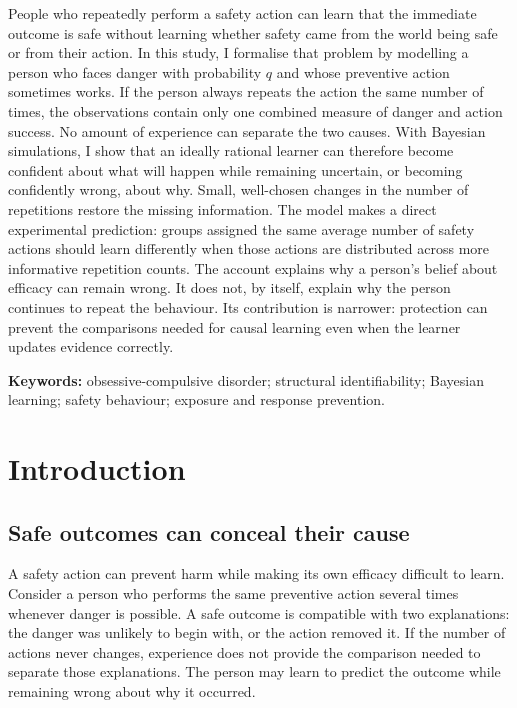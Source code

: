 \documentclass[11pt]{article}
\begin{document}
People who repeatedly perform a safety action can learn that the immediate outcome is safe
without learning whether safety came from the world being safe or from their action. In this study, I
formalise that problem by modelling a person who faces danger with probability $q$ and whose preventive
action sometimes works. If the person always repeats the action the same number of times, the observations
contain only one combined measure of danger and action success. No amount of experience can
separate the two causes. With Bayesian simulations, I show that an ideally rational learner can
therefore become confident about what will happen while remaining uncertain, or becoming confidently wrong, about why.
Small, well-chosen changes in the number of repetitions restore the missing information. The model makes a
direct experimental prediction: groups assigned the same average number of safety actions should learn
differently when those actions are distributed across more informative repetition counts. The account
explains why a person's belief about efficacy can remain wrong. It does not, by itself, explain why the
person continues to repeat the behaviour. Its contribution is narrower: protection can prevent the
comparisons needed for causal learning even when the learner updates evidence correctly.

\vspace{1em}
\noindent\textbf{Keywords:} obsessive-compulsive disorder; structural
identifiability; Bayesian learning; safety behaviour; exposure and response
prevention.

\section{Introduction}

\subsection{Safe outcomes can conceal their cause}

A safety action can prevent harm while making its own efficacy difficult to
learn. Consider a person who performs the same preventive action several times
whenever danger is possible. A safe outcome is compatible with two explanations:
the danger was unlikely to begin with, or the action removed it. If the number of
actions never changes, experience does not provide the comparison needed to
separate those explanations. The person may learn to predict the outcome while
remaining wrong about why it occurred.
\end{document}
